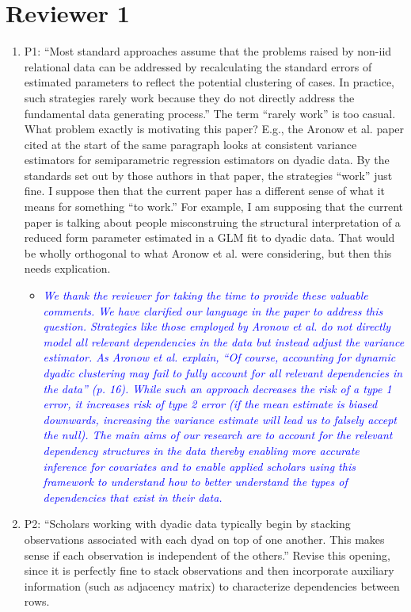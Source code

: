 \section*{Reviewer 1}

\begin{enumerate}
	\item P1: ``Most standard approaches assume that the problems raised by non-iid relational data can be addressed by recalculating the standard errors of estimated parameters to reflect the potential clustering of cases. In practice, such strategies rarely work because they do not directly address the fundamental data generating process.'' The term “rarely work” is too casual.  What problem exactly is motivating this paper?  E.g., the Aronow et al. paper cited at the start of the same paragraph looks at consistent variance estimators for semiparametric regression estimators on dyadic data. By the standards set out by those authors in that paper, the strategies “work” just fine.  I suppose then that the current paper has a different sense of what it means for something “to work.” For example, I am supposing that the current paper is talking about people misconstruing the structural interpretation of a reduced form parameter estimated in a GLM fit to dyadic data.  That would be wholly orthogonal to what Aronow et al. were considering, but then this needs explication.
	\begin{itemize}
		\item \textcolor{blue}{ \emph{
		We thank the reviewer for taking the time to provide these valuable comments. We have clarified our language in the paper to address this question.  Strategies like those employed by Aronow et al. do not directly model all relevant dependencies in the data but instead adjust the variance estimator. As Aronow et al. explain, ``Of course, accounting for dynamic dyadic clustering may fail to fully account for all relevant dependencies in the data'' (p. 16).   While such an approach decreases the risk of a type 1 error, it increases risk of type 2 error (if the mean estimate is biased downwards, increasing the variance estimate will lead us to falsely accept the null). The main aims of our research are to account for the relevant dependency structures in the data thereby enabling more accurate inference for covariates and to enable applied scholars using this framework to understand how to better understand the types of dependencies that exist in their data.
		}}
	\end{itemize}
	\item P2: “Scholars working with dyadic data typically begin by stacking observations associated with each dyad on top of one another. This makes sense if each observation is independent of the others.” Revise this opening, since it is perfectly fine to stack observations and then incorporate auxiliary information (such as adjacency matrix) to characterize dependencies between rows.

\end{enumerate}
